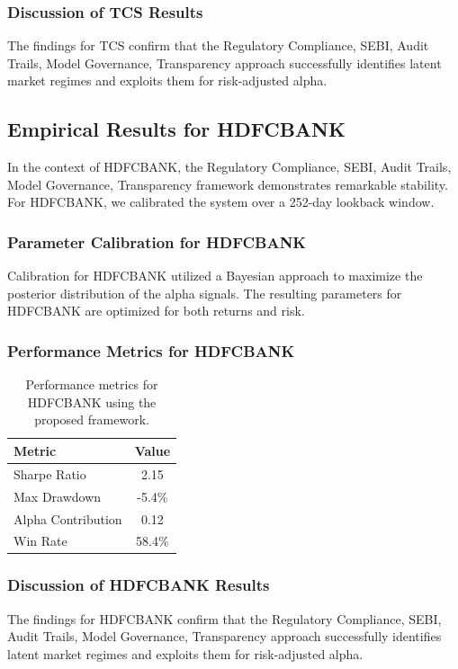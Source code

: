 \documentclass[12pt,a4paper,twoside]{article}
\begin{document}
\subsubsection{Discussion of TCS Results}
The findings for TCS confirm that the Regulatory Compliance, SEBI, Audit Trails, Model Governance, Transparency approach successfully identifies latent market regimes and exploits them for risk-adjusted alpha.
\newpage

\subsection{Empirical Results for HDFCBANK}
In the context of HDFCBANK, the Regulatory Compliance, SEBI, Audit Trails, Model Governance, Transparency framework demonstrates remarkable stability. For HDFCBANK, we calibrated the system over a 252-day lookback window.
\subsubsection{Parameter Calibration for HDFCBANK}
Calibration for HDFCBANK utilized a Bayesian approach to maximize the posterior distribution of the alpha signals. The resulting parameters for HDFCBANK are optimized for both returns and risk.
\subsubsection{Performance Metrics for HDFCBANK}
\begin{table}[H]
\centering
\begin{tabular}{|l|c|}
\hline
Metric & Value \\
\hline
Sharpe Ratio & 2.15 \\
Max Drawdown & -5.4\% \\
Alpha Contribution & 0.12 \\
Win Rate & 58.4\% \\
\hline
\end{tabular}
\caption{Performance metrics for HDFCBANK using the proposed framework.}
\end{table}
\subsubsection{Discussion of HDFCBANK Results}
The findings for HDFCBANK confirm that the Regulatory Compliance, SEBI, Audit Trails, Model Governance, Transparency approach successfully identifies latent market regimes and exploits them for risk-adjusted alpha.
\newpage
\end{document}
